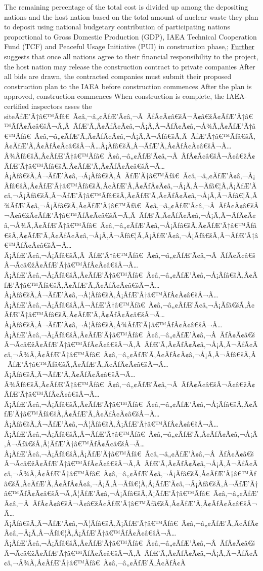 \documentclass{article}
\begin{document}
\begin{outline}[enumerate]
\3 The remaining percentage of the total cost is divided up among the depositing nations and the host nation based on the total amount of nuclear waste they plan to deposit
\3 using national budgetary contribution of participating nations proportional to Gross Domestic  Production (GDP), IAEA Technical Cooperation Fund (TCF) and Peaceful Usage Initiative (PUI)  in construction phase,; 
\1 \underline{Further} suggests that once all nations agree to their financial responsibility to the project, the host nation may release the construction contract to private companies
\2 After all bids are drawn, the contracted companies must submit their proposed construction plan to the IAEA before construction commences
\2 After the plan is approved, construction commences
\2 When construction is complete, the IAEA-certified inspectors asses the siteÃƒÆ’Ã†â€™Ãƒâ€ Ã¢â‚¬â„¢ÃƒÆ’Ã¢â‚¬Â ÃƒÂ¢Ã¢â€šÂ¬Ã¢â€žÂ¢ÃƒÆ’Ã†â€™ÃƒÂ¢Ã¢â€šÂ¬Ã‚Â ÃƒÆ’Ã‚Â¢ÃƒÂ¢Ã¢â‚¬Å¡Ã‚Â¬ÃƒÂ¢Ã¢â‚¬Å¾Ã‚Â¢ÃƒÆ’Ã†â€™Ãƒâ€ Ã¢â‚¬â„¢ÃƒÆ’Ã‚Â¢ÃƒÂ¢Ã¢â‚¬Å¡Ã‚Â¬Ãƒâ€šÃ‚Â ÃƒÆ’Ã†â€™Ãƒâ€šÃ‚Â¢ÃƒÆ’Ã‚Â¢ÃƒÂ¢Ã¢â€šÂ¬Ã…Â¡Ãƒâ€šÃ‚Â¬ÃƒÆ’Ã‚Â¢ÃƒÂ¢Ã¢â€šÂ¬Ã…Â¾Ãƒâ€šÃ‚Â¢ÃƒÆ’Ã†â€™Ãƒâ€ Ã¢â‚¬â„¢ÃƒÆ’Ã¢â‚¬Â ÃƒÂ¢Ã¢â€šÂ¬Ã¢â€žÂ¢ÃƒÆ’Ã†â€™Ãƒâ€šÃ‚Â¢ÃƒÆ’Ã‚Â¢ÃƒÂ¢Ã¢â€šÂ¬Ã…Â¡Ãƒâ€šÃ‚Â¬ÃƒÆ’Ã¢â‚¬Å¡Ãƒâ€šÃ‚Â ÃƒÆ’Ã†â€™Ãƒâ€ Ã¢â‚¬â„¢ÃƒÆ’Ã¢â‚¬Å¡Ãƒâ€šÃ‚Â¢ÃƒÆ’Ã†â€™Ãƒâ€šÃ‚Â¢ÃƒÆ’Ã‚Â¢ÃƒÂ¢Ã¢â‚¬Å¡Ã‚Â¬Ãƒâ€¦Ã‚Â¡ÃƒÆ’Ã¢â‚¬Å¡Ãƒâ€šÃ‚Â¬ÃƒÆ’Ã†â€™Ãƒâ€šÃ‚Â¢ÃƒÆ’Ã‚Â¢ÃƒÂ¢Ã¢â‚¬Å¡Ã‚Â¬Ãƒâ€¦Ã‚Â¾ÃƒÆ’Ã¢â‚¬Å¡Ãƒâ€šÃ‚Â¢ÃƒÆ’Ã†â€™Ãƒâ€ Ã¢â‚¬â„¢ÃƒÆ’Ã¢â‚¬Â ÃƒÂ¢Ã¢â€šÂ¬Ã¢â€žÂ¢ÃƒÆ’Ã†â€™ÃƒÂ¢Ã¢â€šÂ¬Ã‚Â ÃƒÆ’Ã‚Â¢ÃƒÂ¢Ã¢â‚¬Å¡Ã‚Â¬ÃƒÂ¢Ã¢â‚¬Å¾Ã‚Â¢ÃƒÆ’Ã†â€™Ãƒâ€ Ã¢â‚¬â„¢ÃƒÆ’Ã¢â‚¬Å¡Ãƒâ€šÃ‚Â¢ÃƒÆ’Ã†â€™Ãƒâ€šÃ‚Â¢ÃƒÆ’Ã‚Â¢ÃƒÂ¢Ã¢â‚¬Å¡Ã‚Â¬Ãƒâ€¦Ã‚Â¡ÃƒÆ’Ã¢â‚¬Å¡Ãƒâ€šÃ‚Â¬ÃƒÆ’Ã†â€™ÃƒÂ¢Ã¢â€šÂ¬Ã…Â¡ÃƒÆ’Ã¢â‚¬Å¡Ãƒâ€šÃ‚Â ÃƒÆ’Ã†â€™Ãƒâ€ Ã¢â‚¬â„¢ÃƒÆ’Ã¢â‚¬Â ÃƒÂ¢Ã¢â€šÂ¬Ã¢â€žÂ¢ÃƒÆ’Ã†â€™ÃƒÂ¢Ã¢â€šÂ¬Ã…Â¡ÃƒÆ’Ã¢â‚¬Å¡Ãƒâ€šÃ‚Â¢ÃƒÆ’Ã†â€™Ãƒâ€ Ã¢â‚¬â„¢ÃƒÆ’Ã¢â‚¬Å¡Ãƒâ€šÃ‚Â¢ÃƒÆ’Ã†â€™Ãƒâ€šÃ‚Â¢ÃƒÆ’Ã‚Â¢ÃƒÂ¢Ã¢â€šÂ¬Ã…Â¡Ãƒâ€šÃ‚Â¬ÃƒÆ’Ã¢â‚¬Â¦Ãƒâ€šÃ‚Â¡ÃƒÆ’Ã†â€™ÃƒÂ¢Ã¢â€šÂ¬Ã…Â¡ÃƒÆ’Ã¢â‚¬Å¡Ãƒâ€šÃ‚Â¬ÃƒÆ’Ã†â€™Ãƒâ€ Ã¢â‚¬â„¢ÃƒÆ’Ã¢â‚¬Å¡Ãƒâ€šÃ‚Â¢ÃƒÆ’Ã†â€™Ãƒâ€šÃ‚Â¢ÃƒÆ’Ã‚Â¢ÃƒÂ¢Ã¢â€šÂ¬Ã…Â¡Ãƒâ€šÃ‚Â¬ÃƒÆ’Ã¢â‚¬Â¦Ãƒâ€šÃ‚Â¾ÃƒÆ’Ã†â€™ÃƒÂ¢Ã¢â€šÂ¬Ã…Â¡ÃƒÆ’Ã¢â‚¬Å¡Ãƒâ€šÃ‚Â¢ÃƒÆ’Ã†â€™Ãƒâ€ Ã¢â‚¬â„¢ÃƒÆ’Ã¢â‚¬Â ÃƒÂ¢Ã¢â€šÂ¬Ã¢â€žÂ¢ÃƒÆ’Ã†â€™ÃƒÂ¢Ã¢â€šÂ¬Ã‚Â ÃƒÆ’Ã‚Â¢ÃƒÂ¢Ã¢â‚¬Å¡Ã‚Â¬ÃƒÂ¢Ã¢â‚¬Å¾Ã‚Â¢ÃƒÆ’Ã†â€™Ãƒâ€ Ã¢â‚¬â„¢ÃƒÆ’Ã‚Â¢ÃƒÂ¢Ã¢â‚¬Å¡Ã‚Â¬Ãƒâ€šÃ‚Â ÃƒÆ’Ã†â€™Ãƒâ€šÃ‚Â¢ÃƒÆ’Ã‚Â¢ÃƒÂ¢Ã¢â€šÂ¬Ã…Â¡Ãƒâ€šÃ‚Â¬ÃƒÆ’Ã‚Â¢ÃƒÂ¢Ã¢â€šÂ¬Ã…Â¾Ãƒâ€šÃ‚Â¢ÃƒÆ’Ã†â€™Ãƒâ€ Ã¢â‚¬â„¢ÃƒÆ’Ã¢â‚¬Â ÃƒÂ¢Ã¢â€šÂ¬Ã¢â€žÂ¢ÃƒÆ’Ã†â€™ÃƒÂ¢Ã¢â€šÂ¬Ã…Â¡ÃƒÆ’Ã¢â‚¬Å¡Ãƒâ€šÃ‚Â¢ÃƒÆ’Ã†â€™Ãƒâ€ Ã¢â‚¬â„¢ÃƒÆ’Ã¢â‚¬Å¡Ãƒâ€šÃ‚Â¢ÃƒÆ’Ã†â€™Ãƒâ€šÃ‚Â¢ÃƒÆ’Ã‚Â¢ÃƒÂ¢Ã¢â€šÂ¬Ã…Â¡Ãƒâ€šÃ‚Â¬ÃƒÆ’Ã¢â‚¬Â¦Ãƒâ€šÃ‚Â¡ÃƒÆ’Ã†â€™ÃƒÂ¢Ã¢â€šÂ¬Ã…Â¡ÃƒÆ’Ã¢â‚¬Å¡Ãƒâ€šÃ‚Â¬ÃƒÆ’Ã†â€™Ãƒâ€ Ã¢â‚¬â„¢ÃƒÆ’Ã‚Â¢ÃƒÂ¢Ã¢â‚¬Å¡Ã‚Â¬Ãƒâ€šÃ‚Â¦ÃƒÆ’Ã†â€™ÃƒÂ¢Ã¢â€šÂ¬Ã…Â¡ÃƒÆ’Ã¢â‚¬Å¡Ãƒâ€šÃ‚Â¡ÃƒÆ’Ã†â€™Ãƒâ€ Ã¢â‚¬â„¢ÃƒÆ’Ã¢â‚¬Â ÃƒÂ¢Ã¢â€šÂ¬Ã¢â€žÂ¢ÃƒÆ’Ã†â€™ÃƒÂ¢Ã¢â€šÂ¬Ã‚Â ÃƒÆ’Ã‚Â¢ÃƒÂ¢Ã¢â‚¬Å¡Ã‚Â¬ÃƒÂ¢Ã¢â‚¬Å¾Ã‚Â¢ÃƒÆ’Ã†â€™Ãƒâ€ Ã¢â‚¬â„¢ÃƒÆ’Ã¢â‚¬Å¡Ãƒâ€šÃ‚Â¢ÃƒÆ’Ã†â€™Ãƒâ€šÃ‚Â¢ÃƒÆ’Ã‚Â¢ÃƒÂ¢Ã¢â‚¬Å¡Ã‚Â¬Ãƒâ€¦Ã‚Â¡ÃƒÆ’Ã¢â‚¬Å¡Ãƒâ€šÃ‚Â¬ÃƒÆ’Ã†â€™ÃƒÂ¢Ã¢â€šÂ¬Ã‚Â¦ÃƒÆ’Ã¢â‚¬Å¡Ãƒâ€šÃ‚Â¡ÃƒÆ’Ã†â€™Ãƒâ€ Ã¢â‚¬â„¢ÃƒÆ’Ã¢â‚¬Â ÃƒÂ¢Ã¢â€šÂ¬Ã¢â€žÂ¢ÃƒÆ’Ã†â€™Ãƒâ€šÃ‚Â¢ÃƒÆ’Ã‚Â¢ÃƒÂ¢Ã¢â€šÂ¬Ã…Â¡Ãƒâ€šÃ‚Â¬ÃƒÆ’Ã¢â‚¬Â¦Ãƒâ€šÃ‚Â¡ÃƒÆ’Ã†â€™Ãƒâ€ Ã¢â‚¬â„¢ÃƒÆ’Ã‚Â¢ÃƒÂ¢Ã¢â‚¬Å¡Ã‚Â¬Ãƒâ€¦Ã‚Â¡ÃƒÆ’Ã†â€™ÃƒÂ¢Ã¢â€šÂ¬Ã…Â¡ÃƒÆ’Ã¢â‚¬Å¡Ãƒâ€šÃ‚Â¢ÃƒÆ’Ã†â€™Ãƒâ€ Ã¢â‚¬â„¢ÃƒÆ’Ã¢â‚¬Â ÃƒÂ¢Ã¢â€šÂ¬Ã¢â€žÂ¢ÃƒÆ’Ã†â€™ÃƒÂ¢Ã¢â€šÂ¬Ã‚Â ÃƒÆ’Ã‚Â¢ÃƒÂ¢Ã¢â‚¬Å¡Ã‚Â¬ÃƒÂ¢Ã¢â‚¬Å¾Ã‚Â¢ÃƒÆ’Ã†â€™Ãƒâ€ Ã¢â‚¬â„¢ÃƒÆ’Ã‚Â¢ÃƒÂ¢Ã
\end{outline}
\end{document}
